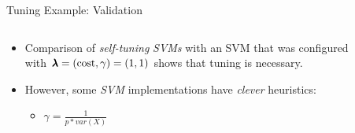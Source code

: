\begin{frame}{Tuning Example: Validation}

\begin{columns}
\begin{column}{0.4\textwidth}
  \footnotesize

  \begin{itemize}
    \item<1-> Comparison of \textit{self-tuning} \emph{SVMs} with an SVM that was configured with $\pmb{\lambda} = (\text{cost},\gamma) = (1,1)$ shows that tuning is necessary.
    \item<2-> However, some \emph{SVM} implementations have \emph{clever} heuristics:
        \begin{itemize}
            \item $\gamma = \frac{1}{p*var(X)}$
        \end{itemize}
  \end{itemize}
\end{column}
\begin{column}{0.6\textwidth}
  \begin{figure}
  \end{figure}
\end{column}
\end{columns}
\end{frame}

